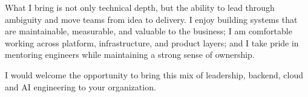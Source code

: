 \documentclass[11pt, a4paper]{src/awesome-cv}
\begin{document}
\begin{cvletter}

\vspace{1em}
\begin{cvparagraph}
What I bring is not only technical depth, but the ability to lead through ambiguity and move teams from idea to delivery. I enjoy building systems that are maintainable, measurable, and valuable to the business; I am comfortable working across platform, infrastructure, and product layers; and I take pride in mentoring engineers while maintaining a strong sense of ownership.

I would welcome the opportunity to bring this mix of leadership, backend, cloud and AI engineering to your organization.
\end{cvparagraph}

\end{cvletter}


\makeletterclosing
\end{document}
